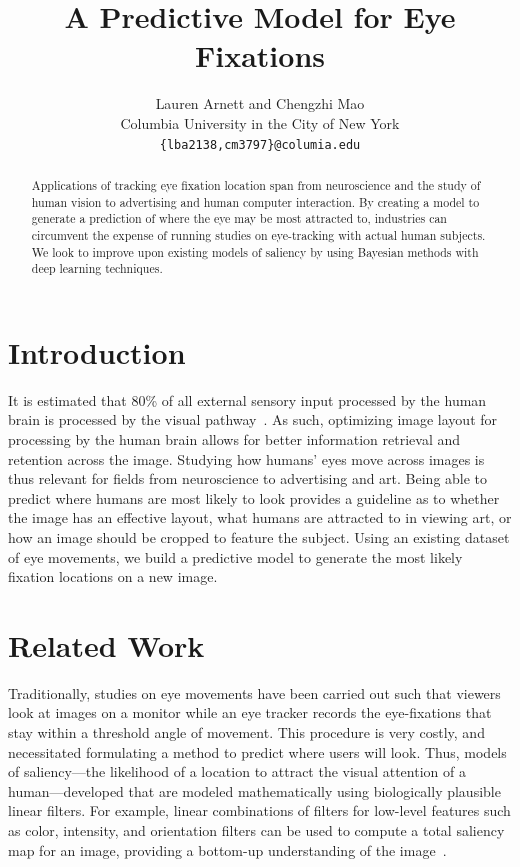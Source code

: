 \documentclass[10pt,twocolumn,letterpaper]{article}
\begin{document}
\title{A Predictive Model for Eye Fixations}

\author{Lauren Arnett and Chengzhi Mao\\
Columbia University in the City of New York\\
    {\tt\small \{lba2138,cm3797\}@columia.edu}
}

\maketitle

\begin{abstract} 
    
    Applications of tracking eye fixation location span from neuroscience and
    the study of human vision to advertising and human computer interaction. By
    creating a model to generate a prediction of where the eye may be most
    attracted to, industries can circumvent the expense of running studies on
    eye-tracking with actual human subjects. We look to improve upon existing
    models of saliency by using Bayesian methods with deep learning techniques.

\end{abstract}

\section{Introduction} It is estimated that 80\% of all external sensory input
processed by the human brain is processed by the visual pathway~\cite{Jerath}.
As such, optimizing image layout for processing by the human brain allows for
better information retrieval and retention across the image. Studying how
humans’ eyes move across images is thus relevant for fields from neuroscience
to advertising and  art. Being able to predict where humans are most likely to
look provides a guideline as to whether the image has an effective layout, what
humans are attracted to in viewing art, or how an image should be cropped to
feature the subject. Using an existing dataset of eye movements, we build
a predictive model to generate the most likely fixation locations on a new
image.
\section{Related Work} 

Traditionally, studies on eye movements have been carried out such that
viewers look at images on a monitor while an eye tracker records the
eye-fixations that stay within a threshold angle of movement. This procedure is
very costly, and necessitated formulating a method to predict where users will
look. Thus, models of saliency---the likelihood of a location to attract the
visual attention of a human---developed that are modeled mathematically using
biologically plausible linear filters. For example, linear combinations of
filters for low-level features such as color, intensity, and orientation
filters can be used to compute a total saliency map for an image,
providing a bottom-up understanding of the image~\cite{Itti}.
\end{document}

